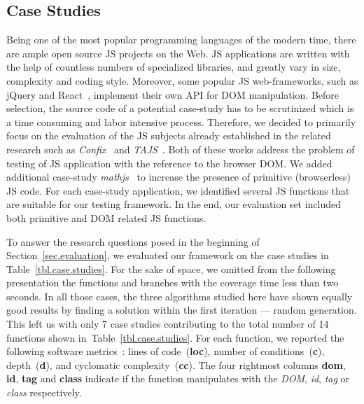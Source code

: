 \subsection{Case Studies}
\label{sub.sec.case.studies}



Being one of the most popular programming languages of the modern time, there are ample open source JS projects on the Web. JS applications are written with the help of countless numbers of specialized libraries, and greatly vary in size, complexity and coding style. Moreover, some popular JS web-frameworks, such as jQuery and React~\cite{todomvc}, implement their own API for DOM manipulation. Before selection, the source code of a potential case-study has to be scrutinized which is a time consuming and labor intensive process. Therefore, we decided to primarily focus on the evaluation of the JS subjects already established in the related research such as \emph{Confix}~\cite{amin:ase15} and \emph{TAJS}~\cite{dom2011, tajsbenchmarks}. Both of these works address the problem of testing of JS application with the reference to the browser DOM. We added additional case-study \emph{mathjs}~\cite{mathjs} to increase the presence of primitive (browserless) JS code. For each case-study application, we identified several JS functions that are suitable for our testing framework. In the end, our evaluation set included both primitive and DOM related JS functions.

To answer the research questions posed in the beginning of Section~\ref{sec.evaluation}, we evaluated our framework on the case studies in Table~\ref{tbl.case.studies}. For the sake of space, we omitted from the following presentation the functions and branches with the coverage time less than two seconds. In all those cases, the three algorithms studied here have shown equally good results by finding a solution within the first iteration --- random generation. This left us with only 7 case studies contributing to the total number of 14 functions  shown in~Table~\ref{tbl.case.studies}. For each function, we reported the following software metrics~\cite{jsmeter}: lines of code~(\textbf{loc}), number of conditions~(\textbf{c}), depth~(\textbf{d}), and cyclomatic complexity~(\textbf{cc}). The four rightmost columns \textbf{dom}, \textbf{id}, \textbf{tag} and \textbf{class} indicate if the function manipulates with the \emph{DOM}, \emph{id}, \emph{tag} or \emph{class} respectively.

